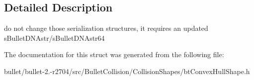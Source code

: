 \subsection{Detailed Description}
do not change those serialization structures, it requires an updated s\+Bullet\+D\+N\+Astr/s\+Bullet\+D\+N\+Astr64 

The documentation for this struct was generated from the following file\+:\begin{DoxyCompactItemize}
\item 
bullet/bullet-\/2.-\/r2704/src/\+Bullet\+Collision/\+Collision\+Shapes/bt\+Convex\+Hull\+Shape.\+h\end{DoxyCompactItemize}
